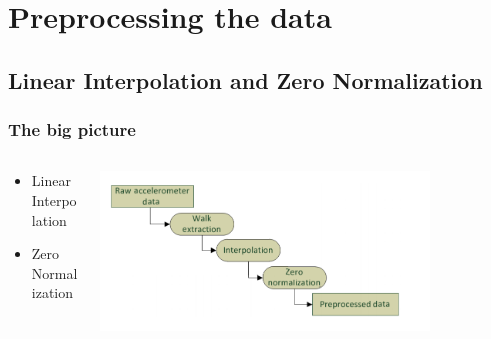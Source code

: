 \documentclass{beamer}
\begin{document}
%	
%				



\section[Preprocessing the data]{Preprocessing the data}
\subsection{Linear Interpolation and Zero Normalization}
\begin{frame}
  \frametitle{The big picture}

  \begin{columns}
  \begin{column}{0.4\textwidth}
  \begin{itemize}
  	\item Linear Interpolation
  	\linebreak
	\item Zero Normalization 
  \end{itemize}
  \end{column}
  \begin{column}{0.8\textwidth}
   \includegraphics[width=0.8\textwidth]{Illustrations/chart1.png}
       \\
  \end{column}
  \end{columns}
\end{frame}
\end{document}
